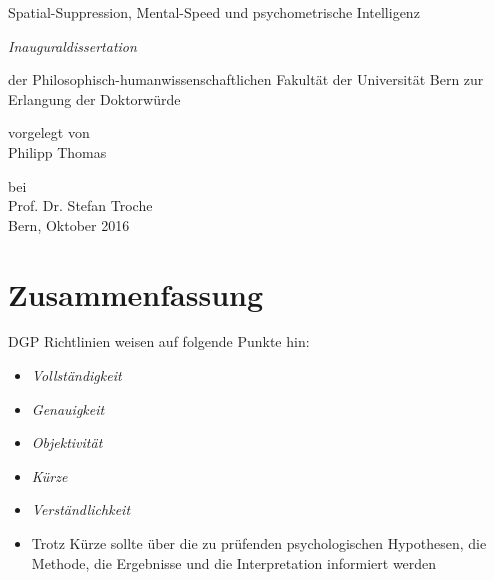 \documentclass[11pt, twoside, a4paper]{book}		%
\begin{document}
\layout								%
\frontmatter						%




\begin{titlepage}
	
	\vspace*{2cm}
	
	\huge\centering Spatial-Suppression, Mental-Speed und psychometrische Intelligenz 
	
	\noindent\makebox[\textwidth]{\rule{\textwidth}{0.4pt}}
	
	\vspace{1.2cm}
	
	{\centering
		\Large \textit{Inauguraldissertation}
		
		\vspace{1.2cm}
		
		der Philosophisch-humanwissenschaftlichen Fakultät der Universität Bern zur Erlangung der Doktorwürde
		
		\vspace{1cm}
		vorgelegt von\\
		Philipp Thomas
		\vspace{1cm}
		
		bei\\
		Prof. Dr. Stefan Troche\\
		
		\vspace*{\fill}
		\Large Bern, Oktober 2016
		
		
	}

\end{titlepage}
\restoregeometry


\chapter*{Zusammenfassung \label{cha:Zusammenfassung}}
\noindent
DGP Richtlinien weisen auf folgende Punkte hin:
\begin{itemize}
	\item \textit{Vollständigkeit}
	\item \textit{Genauigkeit}
	\item \textit{Objektivität}
	\item \textit{Kürze}
	\item \textit{Verständlichkeit}
	\item Trotz Kürze sollte über die zu prüfenden psychologischen Hypothesen, die Methode, die Ergebnisse
		  und die Interpretation informiert werden
\end{itemize}
\end{document}
